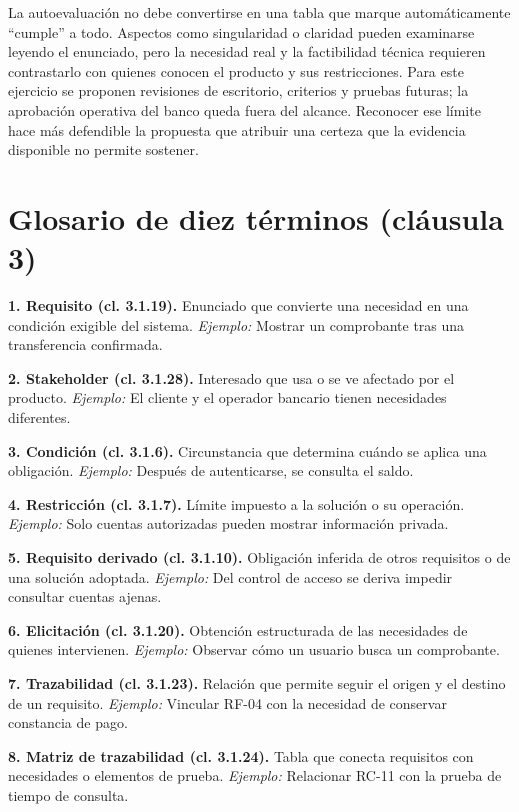 \documentclass[conference,a4paper]{IEEEtran}
\begin{document}
La autoevaluación no debe convertirse en una tabla que marque automáticamente ``cumple'' a todo. Aspectos como singularidad o claridad pueden examinarse leyendo el enunciado, pero la necesidad real y la factibilidad técnica requieren contrastarlo con quienes conocen el producto y sus restricciones. Para este ejercicio se proponen revisiones de escritorio, criterios y pruebas futuras; la aprobación operativa del banco queda fuera del alcance. Reconocer ese límite hace más defendible la propuesta que atribuir una certeza que la evidencia disponible no permite sostener.

\section{Glosario de diez términos (cláusula 3)}
\noindent\textbf{1. Requisito (cl. 3.1.19).} Enunciado que convierte una necesidad en una condición exigible del sistema. \emph{Ejemplo:} Mostrar un comprobante tras una transferencia confirmada.

\noindent\textbf{2. Stakeholder (cl. 3.1.28).} Interesado que usa o se ve afectado por el producto. \emph{Ejemplo:} El cliente y el operador bancario tienen necesidades diferentes.

\noindent\textbf{3. Condición (cl. 3.1.6).} Circunstancia que determina cuándo se aplica una obligación. \emph{Ejemplo:} Después de autenticarse, se consulta el saldo.

\noindent\textbf{4. Restricción (cl. 3.1.7).} Límite impuesto a la solución o su operación. \emph{Ejemplo:} Solo cuentas autorizadas pueden mostrar información privada.

\noindent\textbf{5. Requisito derivado (cl. 3.1.10).} Obligación inferida de otros requisitos o de una solución adoptada. \emph{Ejemplo:} Del control de acceso se deriva impedir consultar cuentas ajenas.

\noindent\textbf{6. Elicitación (cl. 3.1.20).} Obtención estructurada de las necesidades de quienes intervienen. \emph{Ejemplo:} Observar cómo un usuario busca un comprobante.

\noindent\textbf{7. Trazabilidad (cl. 3.1.23).} Relación que permite seguir el origen y el destino de un requisito. \emph{Ejemplo:} Vincular RF-04 con la necesidad de conservar constancia de pago.

\noindent\textbf{8. Matriz de trazabilidad (cl. 3.1.24).} Tabla que conecta requisitos con necesidades o elementos de prueba. \emph{Ejemplo:} Relacionar RC-11 con la prueba de tiempo de consulta.
\end{document}
